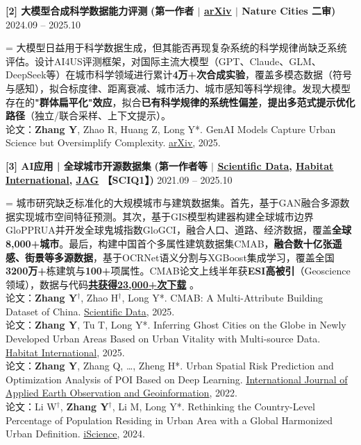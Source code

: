 \documentclass[10pt,a4paper]{article}
\let\oldhref\href
\renewcommand{\href}[2]{\oldhref{#1}{\underline{#2}}}
\newcommand{\project}[3]{%
  \vspace{1pt}
  {\textbf{#1}} {\textbf{(#3)}} \hfill {\color{lightgray}#2}\par\vspace{0pt}
}
\newlength{\projectnumwidth}
\begin{document}
\vspace{12pt}
\project{[2] 大模型合成科学数据能力评测}{2024.09 -- 2025.10}
{第一作者 $|$ \href{https://arxiv.org/abs/2505.13803}{arXiv} $|$ Nature Cities 二审}

\begingroup\leftskip=\projectnumwidth
大模型日益用于科学数据生成，但其能否再现复杂系统的科学规律尚缺乏系统评估。设计AI4US评测框架，对国际主流大模型（GPT、Claude、GLM、DeepSeek等）在城市科学领域进行累计\textbf{4万+次合成实验}，覆盖多模态数据（符号与感知），拟合标度律、距离衰减、城市活力、城市感知等科学规律。发现大模型存在的\textbf{"群体扁平化"效应}，拟合\textbf{已有科学规律的系统性偏差}，\textbf{提出多范式提示优化路径}（独立/联合采样、上下文提示）。\\[2pt]
{论文：\textbf{Zhang Y}, Zhao R, Huang Z, Long Y*. GenAI Models Capture Urban Science but Oversimplify Complexity. \href{https://arxiv.org/abs/2505.13803}{arXiv}, 2025.}\par
\endgroup

\vspace{12pt}
\project{[3] AI应用 | 全球城市开源数据集}{2021.09 -- 2025.10}
{第一作者等 $|$ \href{https://doi.org/10.1038/s41597-025-04730-5}{Scientific Data}, \href{https://doi.org/10.1016/j.habitatint.2025.103350}{Habitat International}, \href{https://doi.org/10.1016/j.jag.2022.102942}{JAG} 【SCIQ1】}

\begingroup\leftskip=\projectnumwidth
城市研究缺乏标准化的大规模城市与建筑数据集。首先，基于GAN融合多源数据实现城市空间特征预测。其次，基于GIS模型构建器构建全球城市边界GloPPRUA并开发全球鬼城指数GloGCI，融合人口、道路、经济数据，覆盖\textbf{全球8,000+城市}。最后，构建中国首个多属性建筑数据集CMAB，\textbf{融合数十亿张遥感、街景等多源数据}，基于OCRNet语义分割与XGBoost集成学习，覆盖全国\textbf{3200万+}栋建筑与\textbf{100+}项属性。CMAB论文上线半年获\textbf{ESI高被引}（Geoscience领域），数据与代码\href{https://figshare.com/authors/Yecheng_Zhang/20402873}{\textbf{共获得23,000+次下载}} 。\\[2pt]
{论文：\textbf{Zhang Y}$^{\dag}$, Zhao H$^{\dag}$, Long Y*. CMAB: A Multi-Attribute Building Dataset of China. \href{https://doi.org/10.1038/s41597-025-04730-5}{Scientific Data}, 2025.\\
论文：\textbf{Zhang Y}, Tu T, Long Y*. Inferring Ghost Cities on the Globe in Newly Developed Urban Areas Based on Urban Vitality with Multi-source Data. \href{https://doi.org/10.1016/j.habitatint.2025.103350}{Habitat International}, 2025.\\
论文：\textbf{Zhang Y}, Zhang Q, \ldots, Zheng H*. Urban Spatial Risk Prediction and Optimization Analysis of POI Based on Deep Learning. \href{https://doi.org/10.1016/j.jag.2022.102942}{International Journal of Applied Earth Observation and Geoinformation}, 2022.\\
论文：Li W$^{\dag}$, \textbf{Zhang Y}$^{\dag}$, Li M, Long Y*. Rethinking the Country-Level Percentage of Population Residing in Urban Area with a Global Harmonized Urban Definition. \href{https://doi.org/10.1016/j.isci.2024.110125}{iScience}, 2024.}\par
\endgroup
\end{document}
